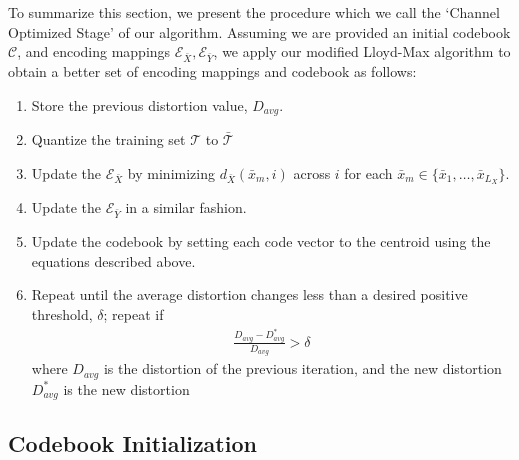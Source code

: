 \documentclass[10pt,twoside,titlepage]{article}
\begin{document}
To summarize this section, we present the procedure which we call the `Channel Optimized Stage' of our algorithm. Assuming we are provided an initial codebook $\mathcal{C}$, and encoding mappings $\mathcal E_{\bar X}, \mathcal E_{\bar Y}$, we apply our modified Lloyd-Max algorithm to obtain a better set of encoding mappings and codebook as follows:

\begin{enumerate}
    \item Store the previous distortion value, $D_{avg}$.
    \item Quantize the training set $\mathcal T$ to $\mathcal{\bar T}$
    \item Update the $\mathcal{E}_{\bar X}$ by minimizing $d_{\bar X}(\bar x_m,i)$ across $i$ for each $\bar x_m \in \{\bar x_1,\ldots,\bar x_{L_X}\}$.
    \item Update the $\mathcal{E}_{\bar Y}$ in a similar fashion.
    \item Update the codebook by setting each code vector to the centroid using the equations described above.
    \item Repeat until the average distortion changes less than a desired positive threshold, $\delta$; repeat if
    \begin{align}
        \frac
        {D_{avg} - D^*_{avg}}
        {D_{avg}}
        > \delta
    \end{align}
    where $D_{avg}$ is the distortion of the previous iteration, and the new distortion $D^*_{avg}$ is the new distortion
\end{enumerate}

\subsection{Codebook Initialization}
%
\end{document}
